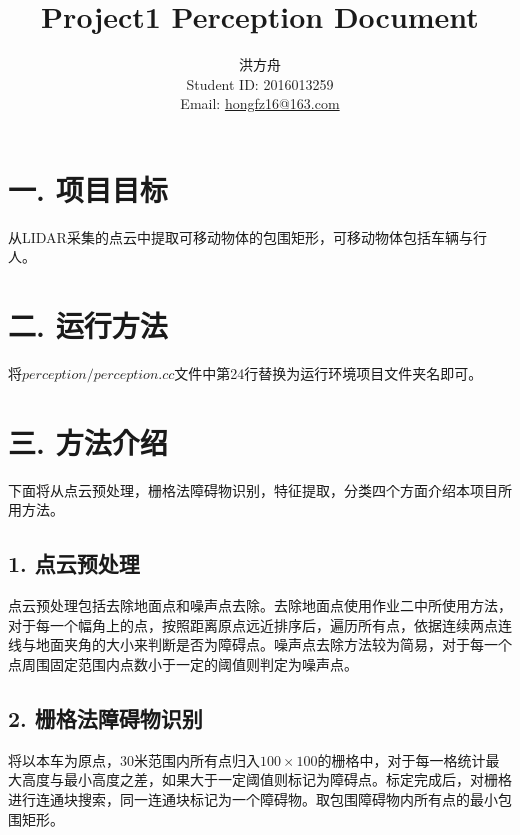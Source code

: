 \documentclass[12pt]{article}
\title{Project1 Perception Document}
\author{洪方舟\\Student ID: 2016013259\\Email: \href{mailto:hongfz16@163.com}{hongfz16@163.com}}
\begin{document}
  \maketitle
  \section*{一. 项目目标}
  	从LIDAR采集的点云中提取可移动物体的包围矩形，可移动物体包括车辆与行人。
  \section*{二. 运行方法}
  	将$perception/perception.cc$文件中第24行替换为运行环境项目文件夹名即可。
  \section*{三. 方法介绍}
  	下面将从点云预处理，栅格法障碍物识别，特征提取，分类四个方面介绍本项目所用方法。
  	\subsection*{1. 点云预处理}
  		点云预处理包括去除地面点和噪声点去除。去除地面点使用作业二中所使用方法，对于每一个幅角上的点，按照距离原点远近排序后，遍历所有点，依据连续两点连线与地面夹角的大小来判断是否为障碍点。噪声点去除方法较为简易，对于每一个点周围固定范围内点数小于一定的阈值则判定为噪声点。
  	\subsection*{2. 栅格法障碍物识别}
  		将以本车为原点，30米范围内所有点归入$100 \times 100$的栅格中，对于每一格统计最大高度与最小高度之差，如果大于一定阈值则标记为障碍点。标定完成后，对栅格进行连通块搜索，同一连通块标记为一个障碍物。取包围障碍物内所有点的最小包围矩形。
\end{document}
